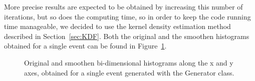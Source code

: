 \documentclass[a4paper, 11pt]{report}
\begin{document}
More precise results are expected to be obtained by increasing this number of iterations, but so does the computing time, so in order to keep the code running time manageable, we decided to use the kernel density estimation method described in Section~\ref{sec:KDF}. Both the original and the smoothen histograms obtained for a single event can be found in Figure~\ref{fig:KDFresults}.

\begin{figure}[htbp]
\begin{center}
\caption{Original and smoothen bi-dimensional histograms along the x and y axes, obtained for a single event generated with the Generator class.}
\label{fig:KDFresults}
\end{center}
\end{figure}
\end{document}
